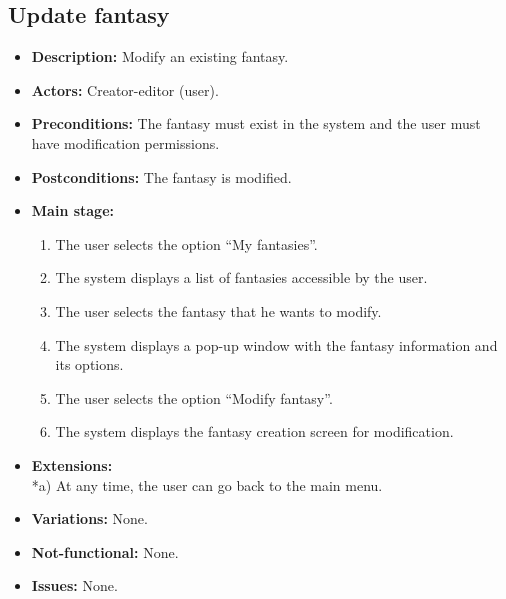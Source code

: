 \subsection{Update fantasy}
\begin{itemize}
	\item \textbf{Description:} Modify an existing fantasy.
	\item \textbf{Actors:} Creator-editor (user).
	\item \textbf{Preconditions:} The fantasy must exist in the system and the user must have modification permissions.
	\item \textbf{Postconditions:} The fantasy is modified.
	\item \textbf{Main stage:}
	\begin{enumerate}
		\item The user selects the option ``My fantasies''.
		\item The system displays a list of fantasies accessible by the user.
		\item The user selects the fantasy that he wants to modify.
		\item The system displays a pop-up window with the fantasy information and its options.
		\item The user selects the option ``Modify fantasy''.
		\item The system displays the fantasy creation screen for modification.
	\end{enumerate}
	\item \textbf{Extensions:} \\ *a) At any time, the user can go back to the main menu.
	\item \textbf{Variations:} None.
	\item \textbf{Not-functional:} None.
	\item \textbf{Issues:} None.
\end{itemize}

